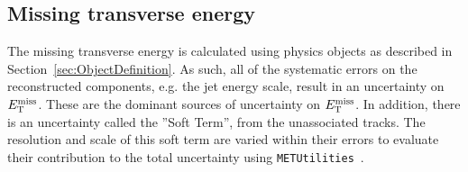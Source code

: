 \subsection*{Missing transverse energy}
 The missing transverse energy is calculated using physics objects as described in Section~\ref{sec:ObjectDefinition}.
As such, all of the systematic errors on the reconstructed components, e.g. the jet energy scale,
result in an uncertainty on $E_\mathrm{T}^\mathrm{miss}$. These are the dominant sources of uncertainty on $E_\mathrm{T}^\mathrm{miss}$.
In addition, there is an uncertainty called the ''Soft Term'', from the unassociated tracks.
The resolution and scale of this soft term are varied within their errors to evaluate their
contribution to the total uncertainty using \texttt{METUtilities}~\cite{METUtilSystematics}.

